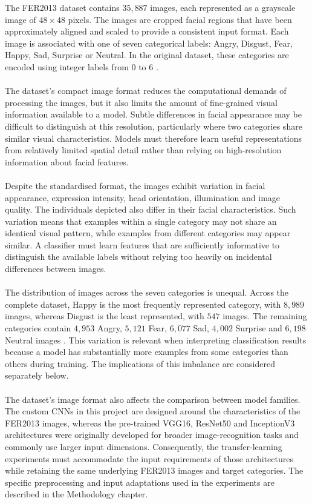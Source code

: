 \documentclass[12pt, a4paper]{report}
\begin{document}
				The FER2013 dataset contains $35,887$ images, each represented as a grayscale image of $48\times48$ pixels. The images are cropped facial regions that have been approximately aligned and scaled to provide a consistent input format. Each image is associated with one of seven categorical labels: Angry, Disgust, Fear, Happy, Sad, Surprise or Neutral. In the original dataset, these categories are encoded using integer labels from $0$ to $6$ \cite{goodfellow2015challenges, fer2013_kaggle}.\\\\
				The dataset's compact image format reduces the computational demands of processing the images, but it also limits the amount of fine-grained visual information available to a model. Subtle differences in facial appearance may be difficult to distinguish at this resolution, particularly where two categories share similar visual characteristics. Models must therefore learn useful representations from relatively limited spatial detail rather than relying on high-resolution information about facial features.\\\\
				 Despite the standardised format, the images exhibit variation in facial appearance, expression intensity, head orientation, illumination and image quality. The individuals depicted also differ in their facial characteristics. Such variation means that examples within a single category may not share an identical visual pattern, while examples from different categories may appear similar. A classifier must learn features that are sufficiently informative to distinguish the available labels without relying too heavily on incidental differences between images.\\\\
				 The distribution of images across the seven categories is unequal. Across the complete dataset, Happy is the most frequently represented category, with $8,989$ images, whereas Disgust is the least represented, with $547$ images. The remaining categories contain $4,953$ Angry, $5,121$ Fear, $6,077$ Sad, $4,002$ Surprise and $6,198$ Neutral images \cite{goodfellow2015challenges, fer2013_kaggle}. This variation is relevant when interpreting classification results because a model has substantially more examples from some categories than others during training. The implications of this imbalance are considered separately below.\\\\
				 The dataset's image format also affects the comparison between model families. The custom CNNs in this project are designed around the characteristics of the FER2013 images, whereas the pre-trained VGG16, ResNet50 and InceptionV3 architectures were originally developed for broader image-recognition tasks and commonly use larger input dimensions. Consequently, the transfer-learning experiments must accommodate the input requirements of those architectures while retaining the same underlying FER2013 images and target categories. The specific preprocessing and input adaptations used in the experiments are described in the Methodology chapter.
				
\end{document}
